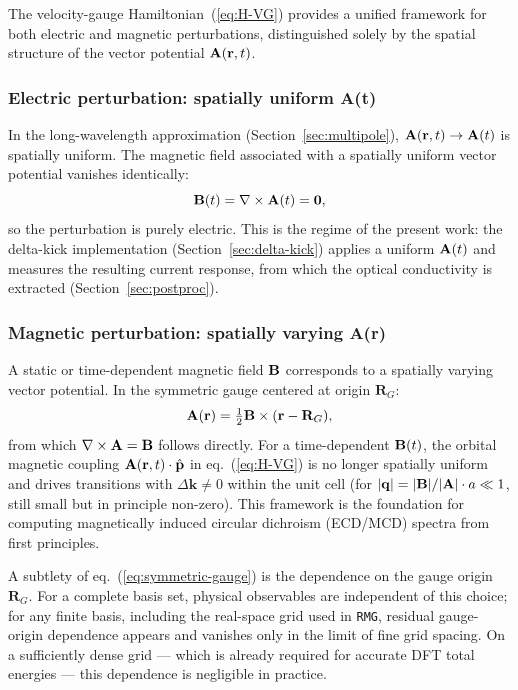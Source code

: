 The velocity-gauge Hamiltonian~(\ref{eq:H-VG}) provides a unified
framework for both electric and magnetic perturbations, distinguished
solely by the spatial structure of the vector potential $\mathbf{A}(\mathbf{r},t)$.

\subsubsection{Electric perturbation: spatially uniform A(t)}
\label{sec:electric-pert}

In the long-wavelength approximation (Section~\ref{sec:multipole}),
$\mathbf{A}(\mathbf{r},t)\to\mathbf{A}(t)$ is spatially uniform.
The magnetic field associated with a spatially uniform vector potential
vanishes identically:
\begin{equation}
  \mathbf{B}(t) = \nabla\times\mathbf{A}(t) = \mathbf{0},
  \label{eq:B-uniform-zero}
\end{equation}
so the perturbation is purely electric.
This is the regime of the present work: the delta-kick
implementation (Section~\ref{sec:delta-kick}) applies a uniform
$\mathbf{A}(t)$ and measures the resulting current response, from which
the optical conductivity is extracted (Section~\ref{sec:postproc}).

\subsubsection{Magnetic perturbation: spatially varying A(r)}
\label{sec:magnetic-pert}

A static or time-dependent magnetic field $\mathbf{B}$ corresponds to a
spatially varying vector potential.
In the symmetric gauge centered at origin $\mathbf{R}_G$:
\begin{equation}
  \mathbf{A}(\mathbf{r})
  = \tfrac{1}{2}\mathbf{B}\times(\mathbf{r}-\mathbf{R}_G),
  \label{eq:symmetric-gauge}
\end{equation}
from which $\nabla\times\mathbf{A} = \mathbf{B}$ follows directly.
For a time-dependent $\mathbf{B}(t)$, the orbital magnetic coupling
$\mathbf{A}(\mathbf{r},t)\cdot\hat{\mathbf{p}}$ in eq.~(\ref{eq:H-VG})
is no longer spatially uniform and drives transitions with
$\Delta\mathbf{k}\neq 0$ within the unit cell (for $|\mathbf{q}|
= |\mathbf{B}|/|\mathbf{A}| \cdot a \ll 1$, still small but in principle
non-zero).
This framework is the foundation for computing magnetically induced
circular dichroism (ECD/MCD) spectra from first
principles.\cite{Mattiat-Luber-2022}

A subtlety of eq.~(\ref{eq:symmetric-gauge}) is the dependence on the
gauge origin $\mathbf{R}_G$.
For a complete basis set, physical observables are independent of
this choice; for any finite basis, including the real-space grid used
in \texttt{RMG}, residual gauge-origin dependence appears and vanishes
only in the limit of fine grid spacing.
On a sufficiently dense grid --- which is already required for
accurate DFT total energies --- this dependence is negligible in
practice.

